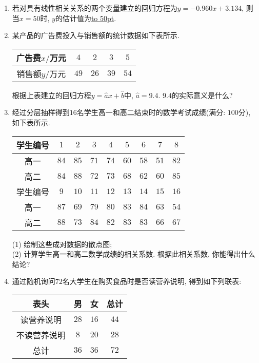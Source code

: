 \documentclass[10pt,a4paper]{article}
\newcommand{\blank}[1]{\underline{\hbox to #1pt{}}}
\begin{document}
\begin{enumerate}[1.]
由此得到回归直线的斜率是\blank{50}.
\item 若对具有线性相关关系的两个变量建立的回归方程为$y=-0.960x+3.134$, 则当$x=50$时, $y$的估计值为\blank{50}.
\item 某产品的广告费投入与销售额的统计数据如下表所示.
\begin{center}
    \begin{tabular}{|c|c|c|c|c|}
        \hline
        广告费$x/$万元 & $4$ & $2$ & $3$ & $5$ \\ \hline
        销售额$y/$万元 & $49$ & $26$ & $39$ & $54$ \\ \hline   
    \end{tabular}
\end{center}
根据上表建立的回归方程$y=\hat ax+\hat b$中, $\hat a=9.4$. $9.4$的实际意义是什么?
\item 经过分层抽样得到$16$名学生高一和高二结束时的数学考试成绩(满分: $100$分), 如下表所示.
\begin{center}
    \begin{tabular}{|c|c|c|c|c|c|c|c|c|}
        \hline
        学生编号& $1$ & $2$ & $3$ & $4$ & $5$ & $6$ & $7$ & $8$ \\ \hline 
        高一& $84$ & $85$ & $71$ & $74$ & $60$ & $58$ & $51$ & $82$ \\ \hline 
        高二& $84$ & $88$ & $72$ & $73$ & $68$ & $62$ & $60$ & $85$ \\ \hline \hline
        学生编号& $9$ & $10$ & $11$ & $12$ & $13$ & $14$ & $15$ & $16$ \\ \hline 
        高一& $87$ & $69$ & $79$ & $80$ & $83$ & $84$ & $63$ & $54$ \\ \hline 
        高二& $88$ & $73$ & $84$ & $82$ & $83$ & $83$ & $66$ & $67$ \\ \hline
    \end{tabular}
\end{center}
(1) 绘制这些成对数据的散点图;\\
(2) 计算学生高一和高二数学成绩的相关系数. 根据此相关系数, 你能得出什么
结论?
\item 通过随机询问$72$名大学生在购买食品时是否读营养说明, 得到如下列联表:
\begin{center}
    \begin{tabular}{|c|c|c|c|}
        \hline
        表头 & 男 & 女 & 总计\\ \hline 
        读营养说明& $28$& $16$& $44$\\ \hline 
        不读营养说明& $8$& $20$& $28$\\ \hline 
        总计& $36$& $36$& $72$\\ \hline 

\end{tabular}
\end{center}
\end{enumerate}
\end{document}
